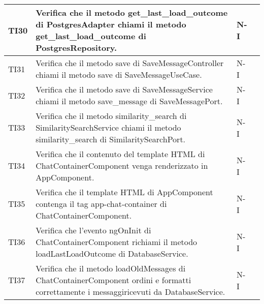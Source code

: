 \begin{table}[h!]
\begin{tabularx}{\textwidth}{|p{}|X|p{}|p{}|}
    TI30 & Verifica che il metodo get\_last\_load\_outcome di PostgresAdapter chiami il metodo get\_last\_load\_outcome di PostgresRepository. &  N-I \\ \hline
    TI31 & Verifica che il metodo save di SaveMessageController chiami il metodo save di SaveMessageUseCase. &  N-I \\ \hline
    TI32 & Verifica che il metodo save di SaveMessageService chiami il metodo save\_message di SaveMessagePort. &  N-I \\ \hline
    TI33 & Verifica che il metodo similarity\_search di SimilaritySearchService chiami il metodo similarity\_search di SimilaritySearchPort. &  N-I \\ \hline
    TI34 & Verifica che il contenuto del template HTML di ChatContainerComponent venga renderizzato in AppComponent. &  N-I \\ \hline
    TI35 & Verifica che il template HTML di AppComponent contenga il tag app-chat-container di ChatContainerComponent. &  N-I \\ \hline
    TI36 & Verifica che l'evento ngOnInit di ChatContainerComponent richiami il metodo loadLastLoadOutcome di DatabaseService. &  N-I \\ \hline
    TI37 & Verifica che il metodo loadOldMessages di ChatContainerComponent ordini e formatti correttamente i messaggiricevuti da DatabaseService. &  N-I \\ \hline
    \end{tabularx}
\end{table}

\newpage

